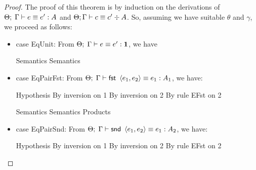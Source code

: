 \begin{proof}
The proof of this theorem is by induction on the derivations of ${\Theta};\;{\Gamma} \vdash {e} \equiv {e'} : {A}$
and ${\Theta};{\Gamma} \vdash {c} \equiv {c'} \div {A}$. So, assuming we have suitable $\theta$ and $\gamma$, we
proceed as follows:

\begin{itemize}
\item case EqUnit: From ${\Theta};\;{\Gamma} \vdash {e} \equiv {e'} : {\mathbf{1}}$, we have

  \begin{eqnproof}
  \end{eqnproof}

  \begin{eqnproof}
          {Semantics}
          {Semantics}
  \end{eqnproof}

\item case EqPairFst: From ${\Theta};\;{\Gamma} \vdash {\mbox{\textsf{{fst }}} \left<{e_1},{e_2}\right>} \equiv {e_1} : {A_1}$, we have:

  \begin{eqnproof}
              {Hypothesis}
           {By inversion on 1}
              {By inversion on 2}
              {By rule EFst on 2}
  \end{eqnproof}

  \begin{eqnproof}[\interpE{\judgeE{\Gamma}{\fst{\pair{e_1}{e_2}}}{A_1}}\;\theta\;\gamma =]
          {Semantics}
          {Semantics}
          {Products}
  \end{eqnproof}

\item case EqPairSnd: From ${\Theta};\;{\Gamma} \vdash {\mbox{\textsf{{snd }}} \left<{e_1},{e_2}\right>} \equiv {e_1} : {A_2}$, we have:

  \begin{eqnproof}
              {Hypothesis}
           {By inversion on 1}
              {By inversion on 2}
              {By rule EFst on 2}
  \end{eqnproof}


\end{itemize}
\end{proof}
